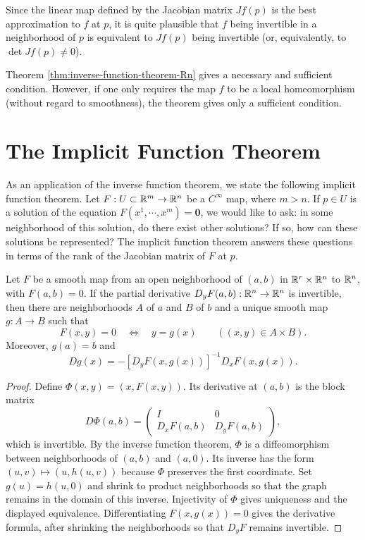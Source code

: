 Since the linear map defined by the Jacobian matrix $Jf(p)$ is the best
approximation to $f$ at $p$, it is quite plausible that $f$ being invertible
in a neighborhood of $p$ is equivalent to $Jf(p)$ being invertible (or,
equivalently, to $\det Jf(p)\neq 0$).


\begin{remark}
	Theorem \ref{thm:inverse-function-theorem-Rn} gives a necessary and
	sufficient condition. However, if one only requires the map $f$ to be a
	local homeomorphism (without regard to smoothness), the theorem gives
	only a sufficient condition.
\end{remark}




\section{The Implicit Function Theorem}

As an application of the inverse function theorem, we state the following
implicit function theorem. Let $F:U\subset\mathbb R^m\to\mathbb R^n$ be a $C^\infty$ map,
where $m>n$. If $p\in U$ is a solution of the equation $F(x^1,\cdots,
	x^m)=\bm{0}$, we would like to ask: in some neighborhood of this
solution, do there exist other solutions? If so, how can these solutions be
represented? The implicit function theorem answers these questions in terms of
the rank of the Jacobian matrix of $F$ at $p$.



\begin{theorem}
\label{thm:appendix-implicit}
Let $F$ be a smooth map from an open neighborhood of $(a,b)$ in
$\mathbb R^r\times\mathbb R^n$ to $\mathbb R^n$, with $F(a,b)=0$. If the partial derivative
$D_yF(a,b):\mathbb R^n\to\mathbb R^n$ is invertible, then there are neighborhoods
$A$ of $a$ and $B$ of $b$ and a unique smooth map $g:A\to B$ such that
\[
 F(x,y)=0\quad\Longleftrightarrow\quad y=g(x)
 \qquad((x,y)\in A\times B).
\]
Moreover, $g(a)=b$ and
\[
 Dg(x)=-[D_yF(x,g(x))]^{-1}D_xF(x,g(x)).
\]
\end{theorem}
\begin{proof}
Define $\Phi(x,y)=(x,F(x,y))$. Its derivative at $(a,b)$ is the block matrix
\[
 D\Phi(a,b)=\begin{pmatrix}I&0\\D_xF(a,b)&D_yF(a,b)\end{pmatrix},
\]
which is invertible. By the inverse function theorem, $\Phi$ is a
diffeomorphism between neighborhoods of $(a,b)$ and $(a,0)$. Its inverse
has the form $(u,v)\mapsto(u,h(u,v))$ because $\Phi$ preserves the first
coordinate. Set $g(u)=h(u,0)$ and shrink to product neighborhoods so that
the graph remains in the domain of this inverse. Injectivity of $\Phi$
gives uniqueness and the displayed equivalence. Differentiating
$F(x,g(x))=0$ gives the derivative formula, after shrinking the neighborhoods
so that $D_yF$ remains invertible.
\end{proof}

